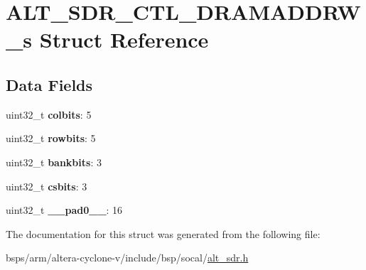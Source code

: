 \hypertarget{structALT__SDR__CTL__DRAMADDRW__s}{}\section{A\+L\+T\+\_\+\+S\+D\+R\+\_\+\+C\+T\+L\+\_\+\+D\+R\+A\+M\+A\+D\+D\+R\+W\+\_\+s Struct Reference}
\label{structALT__SDR__CTL__DRAMADDRW__s}
\subsection*{Data Fields}
\begin{DoxyCompactItemize}
\item 
\mbox{\label{structALT__SDR__CTL__DRAMADDRW__s_a5d28749b47ff63d988e7066fc7a7517b}} 
uint32\+\_\+t {\bfseries colbits}\+: 5
\item 
\mbox{\label{structALT__SDR__CTL__DRAMADDRW__s_aaa091046d4a442a6a6ca4dd3b5c653a1}} 
uint32\+\_\+t {\bfseries rowbits}\+: 5
\item 
\mbox{\label{structALT__SDR__CTL__DRAMADDRW__s_a35175d3772239d10983471cc616d7c92}} 
uint32\+\_\+t {\bfseries bankbits}\+: 3
\item 
\mbox{\label{structALT__SDR__CTL__DRAMADDRW__s_a872d5566178d34a7b8ed54eb58190cea}} 
uint32\+\_\+t {\bfseries csbits}\+: 3
\item 
\mbox{\label{structALT__SDR__CTL__DRAMADDRW__s_a1d50f8b8882fcb400d064b8e28950c8d}} 
uint32\+\_\+t {\bfseries \+\_\+\+\_\+pad0\+\_\+\+\_\+}\+: 16
\end{DoxyCompactItemize}


The documentation for this struct was generated from the following file\+:\begin{DoxyCompactItemize}
\item 
bsps/arm/altera-\/cyclone-\/v/include/bsp/socal/\mbox{\hyperlink{alt__sdr_8h}{alt\+\_\+sdr.\+h}}\end{DoxyCompactItemize}
